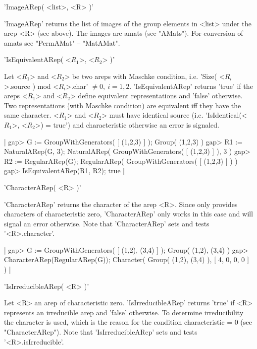 'ImageARep( <list>, <R> )'

'ImageARep' returns the list of images of the group elements in 
<list> under the arep <R> (see above). The images are amats 
(see "AMats"). For conversion of amats see "PermAMat" -- "MatAMat".


'IsEquivalentARep( <$R_1$>, <$R_2$> )'

Let <$R_1$> and <$R_2$> be two areps with Maschke condition, 
i.e. 'Size( <$R_i$>.source ) mod <$R_i$>.char' $\neq 0,\ i = 1,2$.
'IsEquivalentARep' returns 'true' if the areps <$R_1$> and <$R_2$> 
define equivalent representations and 'false' otherwise. 
Two representations (with Maschke condition) are equivalent iff they 
have the same character.
<$R_1$> and <$R_2$> must have identical source 
(i.e. 'IsIdentical(<$R_1$>, <$R_2$>) = true') 
and characteristic otherwise an error is signaled.

|    gap> G := GroupWithGenerators( [ (1,2,3) ] );
    Group( (1,2,3) )
    gap> R1 := NaturalARep(G, 3);
    NaturalARep( GroupWithGenerators( [ (1,2,3) ] ), 3 )
    gap> R2 := RegularARep(G);
    RegularARep( GroupWithGenerators( [ (1,2,3) ] ) )
    gap> IsEquivalentARep(R1, R2);
    true |


'CharacterARep( <R> )'

'CharacterARep' returns the character of the arep <R>.
Since {\GAP} only provides characters of characteristic
zero, 'CharacterARep' only works in this case and will 
signal an error otherwise.
Note that 'CharacterARep' sets and tests '<R>.character'.

|    gap> G := GroupWithGenerators( [ (1,2), (3,4) ] );
    Group( (1,2), (3,4) )
    gap> CharacterARep(RegularARep(G));
    Character( Group( (1,2), (3,4) ), [ 4, 0, 0, 0 ] ) |


'IsIrreducibleARep( <R> )'

Let <R> an arep of characteristic zero. 'IsIrreducibleARep' returns
'true' if <R> represents an irreducible arep and 'false'
otherwise. To determine irreducibility the character is used, 
which is the reason for the condition characteristic = 0 
(see "CharacterARep").
Note that 'IsIrreducibleARep' sets and tests '<R>.isIrreducible'.

